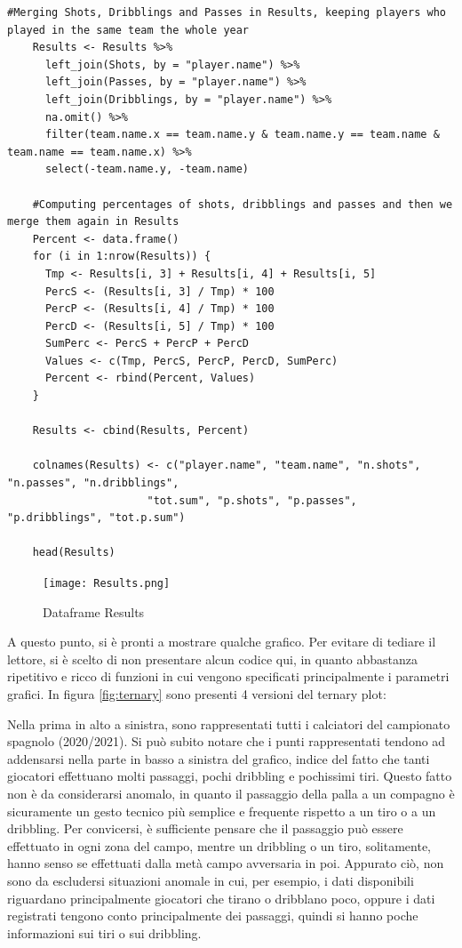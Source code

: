             \begin{lstlisting}[numbers=None]
    #Merging Shots, Dribblings and Passes in Results, keeping players who played in the same team the whole year
    Results <- Results %>%
      left_join(Shots, by = "player.name") %>%
      left_join(Passes, by = "player.name") %>%
      left_join(Dribblings, by = "player.name") %>%
      na.omit() %>%
      filter(team.name.x == team.name.y & team.name.y == team.name & team.name == team.name.x) %>%
      select(-team.name.y, -team.name)
    
    #Computing percentages of shots, dribblings and passes and then we merge them again in Results 
    Percent <- data.frame()
    for (i in 1:nrow(Results)) {
      Tmp <- Results[i, 3] + Results[i, 4] + Results[i, 5]
      PercS <- (Results[i, 3] / Tmp) * 100
      PercP <- (Results[i, 4] / Tmp) * 100
      PercD <- (Results[i, 5] / Tmp) * 100
      SumPerc <- PercS + PercP + PercD
      Values <- c(Tmp, PercS, PercP, PercD, SumPerc)
      Percent <- rbind(Percent, Values)
    }
    
    Results <- cbind(Results, Percent)

    colnames(Results) <- c("player.name", "team.name", "n.shots", "n.passes", "n.dribblings", 
                      "tot.sum", "p.shots", "p.passes", "p.dribblings", "tot.p.sum")

    head(Results)
            \end{lstlisting}
            
            \begin{figure}[h]
                \texttt{[image: Results.png]}
                \centering
                \caption{Dataframe Results}
                \label{fig:Results}
            \end{figure}

            A questo punto, si è pronti a mostrare qualche grafico. Per evitare di tediare il lettore, si è scelto di non presentare alcun codice qui, in quanto abbastanza ripetitivo e ricco di funzioni in cui vengono specificati principalmente i parametri grafici. In figura \ref{fig:ternary} sono presenti 4 versioni del ternary plot: 
            
            Nella prima in alto a sinistra, sono rappresentati tutti i calciatori del campionato spagnolo (2020/2021). Si può subito notare che i punti rappresentati tendono ad addensarsi nella parte in basso a sinistra del grafico, indice del fatto che tanti giocatori effettuano molti passaggi, pochi dribbling e pochissimi tiri. Questo fatto non è da considerarsi anomalo, in quanto il passaggio della palla a un compagno è sicuramente un gesto tecnico più semplice e frequente rispetto a un tiro o a un dribbling. Per convicersi, è sufficiente pensare che il passaggio può essere effettuato in ogni zona del campo, mentre un dribbling o un tiro, solitamente, hanno senso se effettuati dalla metà campo avversaria in poi. Appurato ciò, non sono da escludersi situazioni anomale in cui, per esempio, i dati disponibili riguardano principalmente giocatori che tirano o dribblano poco, oppure i dati registrati tengono conto principalmente dei passaggi, quindi si hanno poche informazioni sui tiri o sui dribbling. 
            

